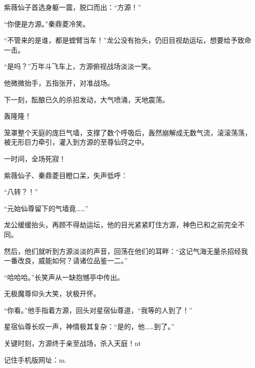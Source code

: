 \begin{this_body}
紫薇仙子首选身躯一震，脱口而出：“方源！”

“你便是方源。”秦鼎菱冷笑。

“不管来的是谁，都是螳臂当车！”龙公没有抬头，仍旧目视劫运坛，想要给予致命一击。

“是吗？”万年斗飞车上，方源俯视战场淡淡一笑。

他微微抬手，五指张开，对准战场。

下一刻，酝酿已久的杀招发动，大气喷涌，天地震荡。

轰隆隆！

笼罩整个天庭的庞巨气墙，支撑了数个呼吸后，轰然崩解成无数气流，滚滚荡荡，被无形巨力牵引，灌入到方源的至尊仙窍之中。

一时间，全场死寂！

紫薇仙子、秦鼎菱目瞪口呆，失声低呼：

“八转？！”

“元始仙尊留下的气墙竟……”

龙公缓缓抬头，再顾不得劫运坛，他的目光紧紧盯住方源，神色已和之前完全不同。

然后，他们就听到方源淡淡的声音，回荡在他们的耳畔：“这记气海无量杀招经我一番改良，威能如何？请诸位品鉴一二。”

“哈哈哈。”长笑声从一缺抱憾亭中传出。

无极魔尊仰头大笑，状极开怀。

“你看。”他手指着方源，回头对星宿仙尊道，“我等的人到了！”

星宿仙尊长叹一声，神情极其复杂：“是的，他……到了。”

关键时刻，方源终于亲至战场，杀入天庭！nt

记住手机版网址：m.

\end{this_body}

